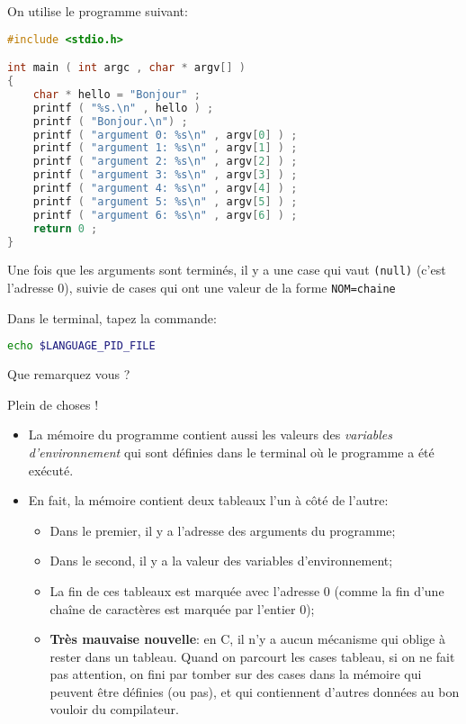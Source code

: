 \begin{solution}
  On utilise le programme suivant:
  \begin{lstlisting}[language=C]
#include <stdio.h>

int main ( int argc , char * argv[] )
{
    char * hello = "Bonjour" ;
    printf ( "%s.\n" , hello ) ;
    printf ( "Bonjour.\n") ;
    printf ( "argument 0: %s\n" , argv[0] ) ;
    printf ( "argument 1: %s\n" , argv[1] ) ;
    printf ( "argument 2: %s\n" , argv[2] ) ;
    printf ( "argument 3: %s\n" , argv[3] ) ;
    printf ( "argument 4: %s\n" , argv[4] ) ;
    printf ( "argument 5: %s\n" , argv[5] ) ;
    printf ( "argument 6: %s\n" , argv[6] ) ;
    return 0 ;
}
  \end{lstlisting}
  Une fois que les arguments sont terminés, il y a une case qui vaut
  \texttt{(null)} (c'est l'adresse 0), suivie de cases qui ont une
  valeur de la forme \texttt{NOM=chaine}
\end{solution}

\question Dans le terminal, tapez la commande:
\begin{lstlisting}[language=bash]
  echo $LANGUAGE_PID_FILE
\end{lstlisting}
Que remarquez vous ?

\begin{solution}
  Plein de choses !
  \begin{itemize}
  \item La mémoire du programme contient aussi les valeurs des
    \emph{variables d'environnement} qui sont définies dans le
    terminal où le programme a été exécuté.
  \item En fait, la mémoire contient deux tableaux l'un à côté de l'autre:
    \begin{itemize}
    \item Dans le premier, il y a l'adresse des arguments du programme;
    \item Dans le second, il y a la valeur des variables d'environnement;
    \item La fin de ces tableaux est marquée avec l'adresse 0 (comme
      la fin d'une chaîne de caractères est marquée par l'entier 0);
    \item \textbf{Très mauvaise nouvelle}: en C, il n'y a aucun
      mécanisme qui oblige à rester dans un tableau. Quand on parcourt
      les cases tableau, si on ne fait pas attention, on fini par
      tomber sur des cases dans la mémoire qui peuvent être définies
      (ou pas), et qui contiennent d'autres données au bon vouloir du
      compilateur. 
    \end{itemize}
  \end{itemize}

\end{solution}

